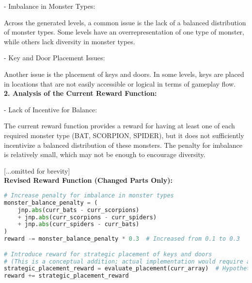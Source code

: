 \begin{tcolorbox}[colback=white, colframe=gray, title=Feedback, breakable]
- Imbalance in Monster Types:

Across the generated levels, a common issue is the lack of a balanced distribution of monster types. Some levels have an overrepresentation of one type of monster, while others lack diversity in monster types.

- Key and Door Placement Issues:

Another issue is the placement of keys and doors. In some levels, keys are placed in locations that are not easily accessible or logical in terms of gameplay flow. \\

\textbf{2. Analysis of the Current Reward Function:}

- Lack of Incentive for Balance:

The current reward function provides a reward for having at least one of each required monster type (BAT, SCORPION, SPIDER), but it does not sufficiently incentivize a balanced distribution of these monsters. The penalty for imbalance is relatively small, which may not be enough to encourage diversity.

[...omitted for brevity] \\

\textbf{Revised Reward Function (Changed Parts Only):}

\begin{lstlisting}[language=Python]
# Increase penalty for imbalance in monster types
monster_balance_penalty = (
    jnp.abs(curr_bats - curr_scorpions)
    + jnp.abs(curr_scorpions - curr_spiders)
    + jnp.abs(curr_spiders - curr_bats)
)
reward -= monster_balance_penalty * 0.3  # Increased from 0.1 to 0.3

# Introduce reward for strategic placement of keys and doors
# (This is a conceptual addition; actual implementation would require additional logic to evaluate placement)
strategic_placement_reward = evaluate_placement(curr_array)  # Hypothetical function to evaluate placement
reward += strategic_placement_reward

\end{lstlisting}
\end{tcolorbox}

\vspace{1em}

